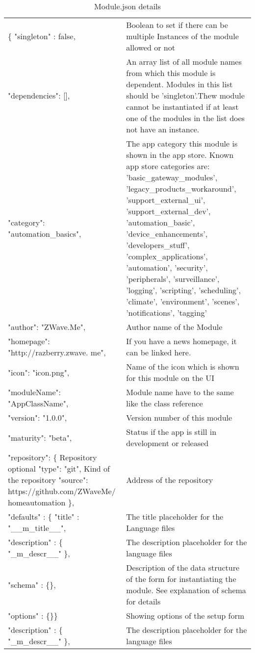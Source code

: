 \begin{table}
\begin{tabular}{|p{}|p{}|}
\hline
\{ "singleton" : false, &
Boolean to set if there can be multiple Instances of the
module allowed or not \\
"dependencies": [], & 
An array list of all module names from which this module is dependent. Modules in this list
should be 'singleton'.Thew module cannot be instantiated if at least one of the modules
in the list does not have an instance. \\
\hline
"category": "automation\_basics", & 
The app category this module is shown in the app store. Known app store categories are:
'basic\_gateway\_modules',
'legacy\_products\_workaround', 'support\_external\_ui',
'support\_external\_dev', 'automation\_basic',
'device\_enhancements', 'developers\_stuff',
'complex\_applications', 'automation', 'security',
'peripherals', 'surveillance', 'logging', 'scripting',
'scheduling', 'climate', 'environment', 'scenes',
'notifications', 'tagging' \\
\hline
"author": "ZWave.Me", & Author name of the Module \\
\hline
"homepage": "http://razberry.zwave. me", &
If you have a news homepage, it can be linked here. \\
\hline
"icon": "icon.png", & Name of the icon which is shown for this module
on the UI \\
\hline
"moduleName": "AppClassName", & Module name have to the same like the class
reference \\
\hline
"version": "1.0.0", &Version number of this module \\
\hline
"maturity": "beta", & Status if the app is still in development or released \\
\hline
"repository": \{ Repository optional "type": "git", Kind of the repository
"source":
https://github.com/ZWaveMe/ homeautomation \}, &
Address of the repository \\
\hline
"defaults" : \{ "title" : "\_\_m\_title\_\_", & The title placeholder for the Language files \\
\hline
"description" : \{ "\_m\_descr\_\_" \}, &
The description placeholder for the language files \\
\hline
"schema" : \{\}, & Description of the data structure of the form for
instantiating the module. See explanation of schema for details \\
\hline
"options" : \{\}\} & Showing options of the setup form\\
\hline
"description" : \{ "\_m\_descr\_\_" \}, &
The description placeholder for the language files \\
\hline
\end{tabular}
\caption{Module.json details} 
\label{tab:module.json}
\end{table}	

